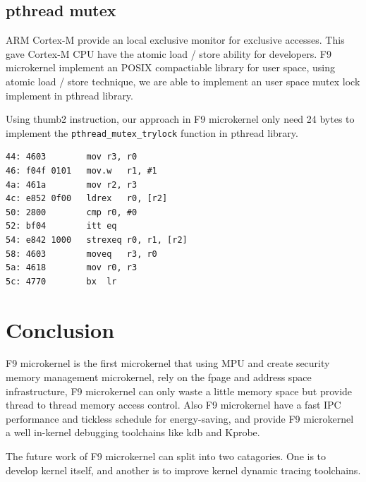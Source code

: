 \documentclass[10pt,preprint,nocopyrightspace]{sigplanconf}
\begin{document}
\subsection{pthread mutex}
ARM Cortex-M provide an local exclusive monitor for exclusive accesses. This gave Cortex-M CPU have the atomic load / store ability for developers\cite{arm2012v7}. F9 microkernel implement an POSIX compactiable library for user space, using atomic load / store technique, we are able to implement an user space mutex lock implement in pthread library.

Using thumb2 instruction, our approach in F9 microkernel only need 24 bytes to implement the \texttt{pthread\_mutex\_trylock} function in pthread library.

\begin{lstlisting}[basicstyle=\small,frame=single]
44:	4603      	mov	r3, r0
46:	f04f 0101 	mov.w	r1, #1
4a:	461a      	mov	r2, r3
4c:	e852 0f00 	ldrex	r0, [r2]
50:	2800      	cmp	r0, #0
52:	bf04      	itt	eq
54:	e842 1000 	strexeq	r0, r1, [r2]
58:	4603      	moveq	r3, r0
5a:	4618      	mov	r0, r3
5c:	4770      	bx	lr
\end{lstlisting}

\section{Conclusion}
F9 microkernel is the first microkernel that using MPU and create security memory management microkernel, rely on the fpage and address space infrastructure, F9 microkernel can only waste a little memory space but provide thread to thread memory access control. Also F9 microkernel have a fast IPC performance and tickless schedule for energy-saving, and provide F9 microkernel a well in-kernel debugging toolchains like kdb and Kprobe.

The future work of F9 microkernel can split into two catagories. One is to develop kernel itself, and another is to improve kernel dynamic tracing toolchains.


\end{document}
